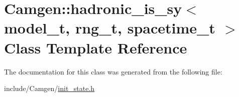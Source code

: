 \hypertarget{a00254}{\section{Camgen\-:\-:hadronic\-\_\-is\-\_\-sy$<$ model\-\_\-t, rng\-\_\-t, spacetime\-\_\-t $>$ Class Template Reference}
\label{a00254}
}


The documentation for this class was generated from the following file\-:\begin{DoxyCompactItemize}
\item 
include/\-Camgen/\hyperlink{a00649}{init\-\_\-state.\-h}\end{DoxyCompactItemize}
